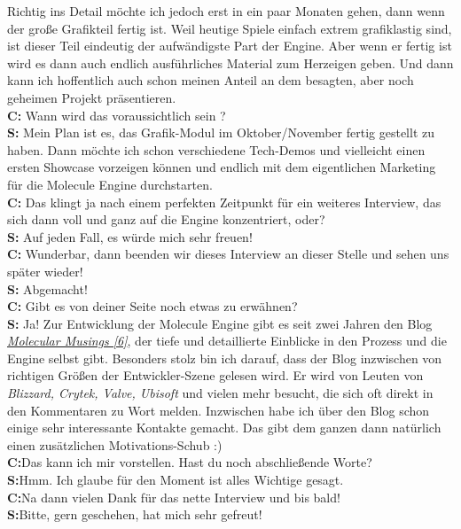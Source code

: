\documentclass[10pt,a4paper,ngerman,twoside]{article} %
\begin{document}
\begin{multicols}{3}
Richtig ins Detail möchte ich jedoch erst in ein paar Monaten gehen, dann wenn der große Grafikteil fertig ist. Weil heutige Spiele einfach extrem grafiklastig sind, ist dieser Teil eindeutig der aufwändigste Part der Engine. Aber wenn er fertig ist wird es dann auch endlich ausführliches Material zum Herzeigen geben. Und dann kann ich hoffentlich auch schon meinen Anteil an dem besagten, aber noch geheimen Projekt präsentieren. \\
\textbf{C:} Wann wird das voraussichtlich sein ? \\
\textbf{S:} Mein Plan ist es, das Grafik-Modul im Oktober/November fertig gestellt zu haben. Dann möchte ich schon verschiedene Tech-Demos und vielleicht einen ersten Showcase vorzeigen können und endlich mit dem eigentlichen Marketing für die Molecule Engine durchstarten. \\
\textbf{C:} Das klingt ja nach einem perfekten Zeitpunkt für ein weiteres Interview, das sich dann voll und ganz auf die Engine konzentriert, oder? \\
\textbf{S:} Auf jeden Fall, es würde mich sehr freuen! \\
\textbf{C:} Wunderbar, dann beenden wir dieses Interview an dieser Stelle und sehen uns später wieder!\\
\textbf{S:} Abgemacht! \\
\textbf{C:} Gibt es von deiner Seite noch etwas zu erwähnen? \\
\textbf{S:} Ja! Zur Entwicklung der Molecule Engine gibt es seit zwei Jahren den Blog \href{http://molecularmusings.wordpress.com/}{\textit{Molecular Musings [6]}}, der tiefe und detaillierte Einblicke in den Prozess und die Engine selbst gibt. Besonders stolz bin ich darauf, dass der Blog inzwischen von richtigen Größen der Entwickler-Szene gelesen wird. Er wird von Leuten von \textit{Blizzard, Crytek, Valve, Ubisoft} und vielen mehr besucht, die sich oft direkt in den Kommentaren zu Wort melden. Inzwischen habe ich über den Blog schon einige sehr interessante Kontakte gemacht. Das gibt dem ganzen dann natürlich einen zusätzlichen Motivations-Schub :) \\
\textbf{C:}Das kann ich mir vorstellen. Hast du noch abschließende Worte? \\
\textbf{S:}Hmm. Ich glaube für den Moment ist alles Wichtige gesagt. \\
\textbf{C:}Na dann vielen Dank für das nette Interview und bis bald! \\
\textbf{S:}Bitte, gern geschehen, hat mich sehr gefreut! \\


\end{multicols}
\end{document}
